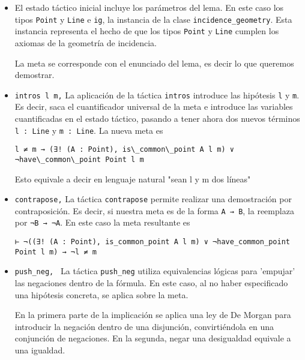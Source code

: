 \begin{itemize}

	\item El estado táctico inicial incluye los parámetros del lema. En este caso
	      los tipos \lstinline{Point} y \lstinline{Line} e \lstinline{ig}, la
	      instancia de la clase \lstinline{incidence_geometry}. Esta instancia
	      representa el hecho de que los tipos \lstinline{Point} y \lstinline{Line}
	      cumplen los axiomas de la geometría de incidencia.

	      La meta se corresponde con el enunciado del lema, es decir lo que queremos
	      demostrar.

	\item \lstinline{intros l m,} La aplicación de la táctica \lstinline{intros}
	      introduce las hipótesis \lstinline{l} y \lstinline{m}. Es decir, saca el
	      cuantificador universal de la meta e introduce las variables cuantificadas
	      en el estado táctico, pasando a tener ahora dos nuevos términos
	      \lstinline{l : Line} y \lstinline{m : Line}. La nueva meta es
	      \begin{lstlisting}
l ≠ m → (∃! (A : Point), is\_common\_point A l m) ∨ ¬have\_common\_point Point l m
          \end{lstlisting}
	      Esto equivale a decir en lenguaje natural "sean l y m dos líneas"

	\item \lstinline{contrapose,} La táctica \lstinline{contrapose} permite
	      realizar una demostración por contraposición. Es decir, si nuestra meta es
	      de la forma \lstinline{A → B}, la reemplaza por \lstinline{¬B → ¬A}. En
	      este caso la meta resultante es
	      \begin{lstlisting}
⊢ ¬((∃! (A : Point), is_common_point A l m) ∨ ¬have_common_point Point l m) → ¬l ≠ m
      \end{lstlisting}

	\item \lstinline{push_neg, } La táctica \lstinline{push_neg} utiliza
	      equivalencias lógicas para 'empujar' las negaciones dentro de la fórmula.
	      En este caso, al no haber especificado una hipótesis concreta, se aplica
	      sobre la meta.

	      En la primera parte de la implicación se aplica una ley de De Morgan para
	      introducir la negación dentro de una disjunción, convirtiéndola en una
	      conjunción de negaciones. En la segunda, negar una desigualdad equivale a
	      una igualdad.


\end{itemize}
